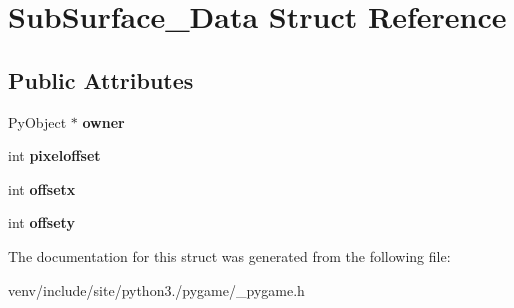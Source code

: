 \hypertarget{struct_sub_surface___data}{}\section{Sub\+Surface\+\_\+\+Data Struct Reference}
\label{struct_sub_surface___data}
\subsection*{Public Attributes}
\begin{DoxyCompactItemize}
\item 
\mbox{\label{struct_sub_surface___data_aa7ef2eced0d9ac5d5a3b91c45f8ebc80}} 
Py\+Object $\ast$ {\bfseries owner}
\item 
\mbox{\label{struct_sub_surface___data_a423c7e48aefddf654ecfec3305e12517}} 
int {\bfseries pixeloffset}
\item 
\mbox{\label{struct_sub_surface___data_ad491ddc13ec7d5d687d946f62ba96f3f}} 
int {\bfseries offsetx}
\item 
\mbox{\label{struct_sub_surface___data_adc6164873b57f8a5ff7d0f0bf3b80e10}} 
int {\bfseries offsety}
\end{DoxyCompactItemize}


The documentation for this struct was generated from the following file\+:\begin{DoxyCompactItemize}
\item 
venv/include/site/python3./pygame/\+\_\+pygame.\+h\end{DoxyCompactItemize}
